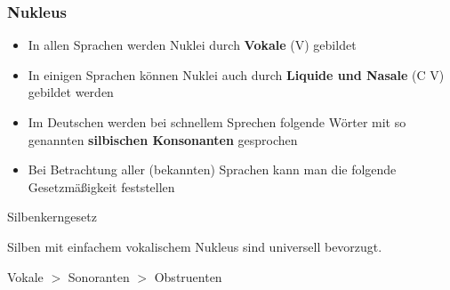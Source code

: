 \begin{frame}
\frametitle{Nukleus}

\begin{itemize}

	\item In allen Sprachen werden Nuklei durch \textbf{Vokale} (V) gebildet
	
	\item In einigen Sprachen können Nuklei auch durch \textbf{Liquide und Nasale} (C \ras V) gebildet werden


	
	\item Im Deutschen werden bei schnellem Sprechen folgende Wörter mit so genannten \textbf{silbischen Konsonanten} gesprochen
	
	
          \ea
           \textipa{[le:.z\textsyllabic{n}]} %
          \z
          
          \ea
           
          \z

	\item Bei Betrachtung aller (bekannten) Sprachen kann man die folgende Gesetzmäßigkeit feststellen \citep[cf.][217f.]{Hall00a}

\end{itemize}
	
	\begin{block}{Silbenkerngesetz}
	
	Silben mit einfachem vokalischem Nukleus sind universell bevorzugt.
	
	Vokale $>$ Sonoranten $>$ Obstruenten 
	
	\end{block}
	
\end{frame}




